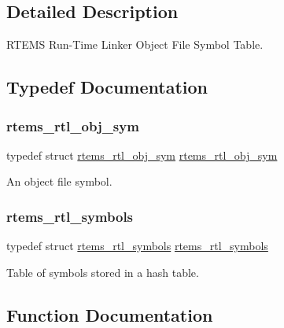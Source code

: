 \subsection{Detailed Description}
R\+T\+E\+MS Run-\/\+Time Linker Object File Symbol Table. 



\subsection{Typedef Documentation}
\mbox{\label{rtl-sym_8h_af23a1068e1c54a0d60312697b21f2276}} 
\subsubsection{\texorpdfstring{rtems\_rtl\_obj\_sym}{rtems\_rtl\_obj\_sym}}
{\footnotesize\ttfamily typedef struct \mbox{\hyperlink{structrtems__rtl__obj__sym}{rtems\+\_\+rtl\+\_\+obj\+\_\+sym}}  \mbox{\hyperlink{structrtems__rtl__obj__sym}{rtems\+\_\+rtl\+\_\+obj\+\_\+sym}}}

An object file symbol. \mbox{\label{rtl-sym_8h_aa84d8fd3d69e40e02e072a09ec000569}} 
\subsubsection{\texorpdfstring{rtems\_rtl\_symbols}{rtems\_rtl\_symbols}}
{\footnotesize\ttfamily typedef struct \mbox{\hyperlink{structrtems__rtl__symbols}{rtems\+\_\+rtl\+\_\+symbols}}  \mbox{\hyperlink{structrtems__rtl__symbols}{rtems\+\_\+rtl\+\_\+symbols}}}

Table of symbols stored in a hash table. 

\subsection{Function Documentation}
\mbox{\label{rtl-sym_8h_acfcaf459050499e3ba535d8f17b1cac7}} 
